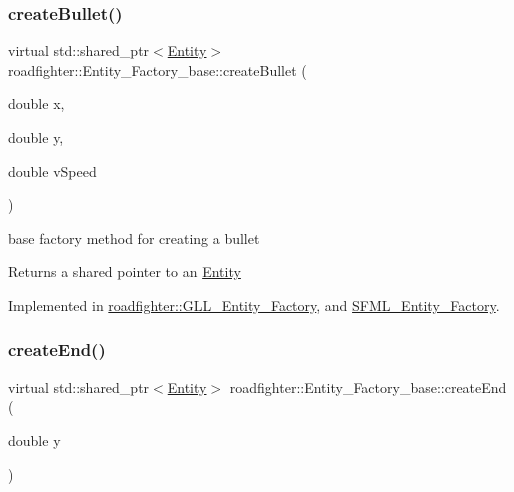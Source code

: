 \mbox{\label{classroadfighter_1_1Entity__Factory__base_a5241bdb886a9f1b086d009a0f6478045}} 
\subsubsection{\texorpdfstring{create\+Bullet()}{createBullet()}}
{\footnotesize\ttfamily virtual std\+::shared\+\_\+ptr$<$\hyperlink{classroadfighter_1_1Entity}{Entity}$>$ roadfighter\+::\+Entity\+\_\+\+Factory\+\_\+base\+::create\+Bullet (\begin{DoxyParamCaption}\item[{double}]{x,  }\item[{double}]{y,  }\item[{double}]{v\+Speed }\end{DoxyParamCaption})\hspace{0.3cm}{\ttfamily [pure virtual]}}

base factory method for creating a bullet \begin{DoxyReturn}{Returns}
a shared pointer to an \hyperlink{classroadfighter_1_1Entity}{Entity} 
\end{DoxyReturn}


Implemented in \hyperlink{classroadfighter_1_1GLL__Entity__Factory_a7fcd57b8a2ae18240476f6dc64216822}{roadfighter\+::\+G\+L\+L\+\_\+\+Entity\+\_\+\+Factory}, and \hyperlink{classSFML__Entity__Factory_ab80783626b22a7746a8e9dd49e48e898}{S\+F\+M\+L\+\_\+\+Entity\+\_\+\+Factory}.

\mbox{\label{classroadfighter_1_1Entity__Factory__base_a791574991ccbe7ff95f28e5651ed2cb1}} 
\subsubsection{\texorpdfstring{create\+End()}{createEnd()}}
{\footnotesize\ttfamily virtual std\+::shared\+\_\+ptr$<$\hyperlink{classroadfighter_1_1Entity}{Entity}$>$ roadfighter\+::\+Entity\+\_\+\+Factory\+\_\+base\+::create\+End (\begin{DoxyParamCaption}\item[{double}]{y }\end{DoxyParamCaption})\hspace{0.3cm}{\ttfamily [pure virtual]}}

